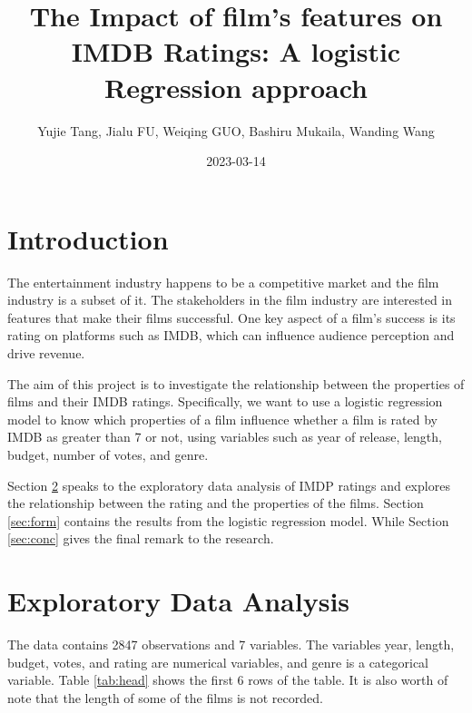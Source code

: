 \documentclass[
]{article}
\title{The Impact of film's features on IMDB Ratings: A logistic
Regression approach}
\author{Yujie Tang, Jialu FU, Weiqing GUO, Bashiru Mukaila, Wanding
Wang}
\date{2023-03-14}
\begin{document}
\maketitle

\hypertarget{sec:intr}{%
\section{Introduction}\label{sec:intr}}

The entertainment industry happens to be a competitive market and the
film industry is a subset of it. The stakeholders in the film industry
are interested in features that make their films successful. One key
aspect of a film's success is its rating on platforms such as IMDB,
which can influence audience perception and drive revenue.

The aim of this project is to investigate the relationship between the
properties of films and their IMDB ratings. Specifically, we want to use
a logistic regression model to know which properties of a film influence
whether a film is rated by IMDB as greater than 7 or not, using
variables such as year of release, length, budget, number of votes, and
genre.

Section \ref{sec:expl} speaks to the exploratory data analysis of IMDP
ratings and explores the relationship between the rating and the
properties of the films. Section \ref{sec:form} contains the results
from the logistic regression model. While Section \ref{sec:conc} gives
the final remark to the research.

\hypertarget{sec:expl}{%
\section{Exploratory Data Analysis}\label{sec:expl}}

The data contains 2847 observations and 7 variables. The variables year,
length, budget, votes, and rating are numerical variables, and genre is
a categorical variable. Table \ref{tab:head} shows the first 6 rows of
the table. It is also worth of note that the length of some of the films
is not recorded.

\begin{table}[!h]

\caption{\label{tab:expl3}\label{tab:head} Highlight of the IMDB data}
\centering
{}
\end{table}
\end{document}
